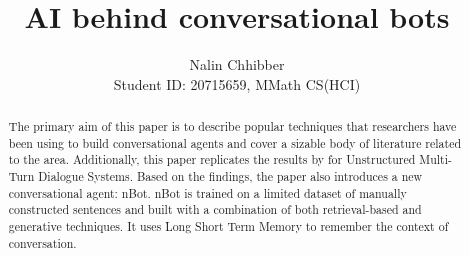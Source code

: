 \documentclass[letterpaper] {article} %
\begin{document}
%
\title{AI behind conversational bots}
\author{Nalin Chhibber\\ Student ID: 20715659, MMath CS(HCI)}
\maketitle
\begin{abstract}
The primary aim of this paper is to describe popular techniques that researchers have been using to build conversational agents and cover a sizable body of literature related to the area. Additionally, this paper replicates the results by \cite{lowe2015ubuntu} for Unstructured Multi-Turn Dialogue Systems. Based on the findings, the paper also introduces a new conversational agent: nBot. nBot is trained on a limited dataset of manually constructed sentences and built with a combination of both retrieval-based and generative techniques. It uses Long Short Term Memory to remember the context of conversation.
\end{abstract}
\end{document}
